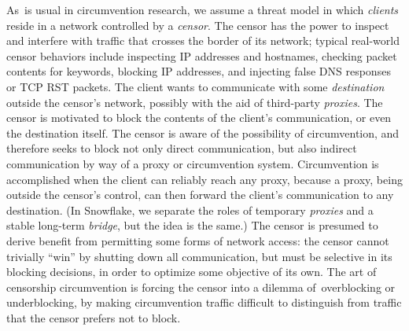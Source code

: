 \documentclass[letterpaper,twocolumn]{article}
\newcommand{\firstterm}[1]{\textit{#1}}
\begin{document}
As~is usual in circumvention research,
we assume a threat model in which
\firstterm{clients} reside in a network
controlled by a \firstterm{censor}.
The censor has the power to inspect and interfere with
traffic that crosses the border of its network;
typical real-world censor behaviors include
inspecting IP addresses and hostnames,
checking packet contents for keywords,
blocking IP addresses, and injecting false DNS responses
or TCP RST packets.
The client wants to communicate with some
\firstterm{destination} outside the censor's network,
possibly with the aid of third-party \firstterm{proxies}.
The censor is motivated to block the contents
of the client's communication, or even the destination itself.
The censor is aware of the possibility of circumvention,
and therefore seeks to block not only direct communication,
but also indirect communication by way of a proxy or circumvention system.
Circumvention is accomplished when the client
can reliably reach any proxy,
because a proxy, being outside the censor's control,
can then forward the client's communication to any destination.
(In Snowflake, we separate the roles of temporary \firstterm{proxies}
and a stable long-term \firstterm{bridge}, but the idea is the same.)
The censor is presumed to derive benefit
from permitting some forms of network access:
the censor cannot trivially ``win''
by shutting down all communication,
but must be selective in its blocking decisions,
in order to optimize some objective of its own.
The art of censorship circumvention is
forcing the censor into a dilemma
of~overblocking or underblocking,
by making circumvention traffic difficult to distinguish
from traffic that the censor prefers not to block.
\end{document}

